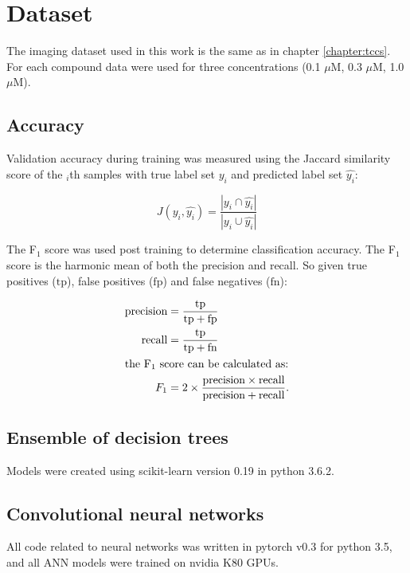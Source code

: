 \documentclass[a4paper,11pt,twoside,openright]{scrbook}
\begin{document}
\section{Dataset}
The imaging dataset used in this work is the same as in chapter \ref{chapter:tccs}.
For each compound data were used for three concentrations (0.1 $\mu$M, 0.3 $\mu$M, 1.0 $\mu$M).


\subsection{Accuracy}
Validation accuracy during training was measured using the Jaccard similarity score of the $_i$th samples with true label set $y_i$ and predicted label set $\hat{y_i}$:

\begin{equation}
    J(y_i, \hat{y_i}) = \frac{|y_i \cap \hat{y_i}|}{|y_i \cup \hat{y_i}|}
\end{equation}

The F$_1$ score was used post training to determine classification accuracy.
The F$_1$ score is the harmonic mean of both the precision and recall.
So given true positives ($\text{tp}$), false positives ($\text{fp}$) and false negatives ($\text{fn}$):

\begin{align}
        \text{precision} &= \frac{ \text{tp} }{ \text{tp} + \text{fp} } \\
        \text{recall} &= \frac{\text{tp}}{\text{tp} + \text{fn}} \\
        \intertext{the F$_1$ score can be calculated as:}
        F_1 &= 2 \times \frac{\text{precision} \times \text{recall}}{\text{precision} + \text{recall}}.
\end{align}

\subsection{Ensemble of decision trees}
Models were created using scikit-learn version 0.19 in python 3.6.2.

\subsection{Convolutional neural networks}


All code related to neural networks was written in pytorch v0.3 for python 3.5, and all ANN models were trained on nvidia K80 GPUs.
\end{document}
